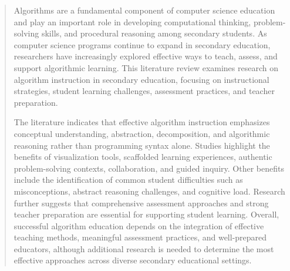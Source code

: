 
% 

\begin{abstract}
Algorithms are a fundamental component of computer science education and play an important role in developing computational thinking, problem-solving
  skills, and procedural reasoning among secondary students.
As computer science programs continue to expand in secondary education, researchers have increasingly explored effective ways to teach, assess, and
  support algorithmic learning.
This literature review examines research on algorithm instruction in secondary education, focusing on instructional strategies, student learning
  challenges, assessment practices, and teacher preparation.

The literature indicates that effective algorithm instruction emphasizes conceptual understanding, abstraction, decomposition, and algorithmic
  reasoning rather than programming syntax alone.
Studies highlight the benefits of visualization tools, scaffolded learning experiences, authentic problem-solving contexts, collaboration, and guided inquiry. 
Other benefits include the identification of common student difficulties such as misconceptions, abstract reasoning challenges, and cognitive load.
Research further suggests that comprehensive assessment approaches and strong teacher preparation are essential for supporting student learning.
Overall, successful algorithm education depends on the integration of effective teaching methods, meaningful assessment practices, and well-prepared
  educators, although additional research is needed to determine the most effective approaches across diverse secondary educational settings.
\end{abstract}


% 
